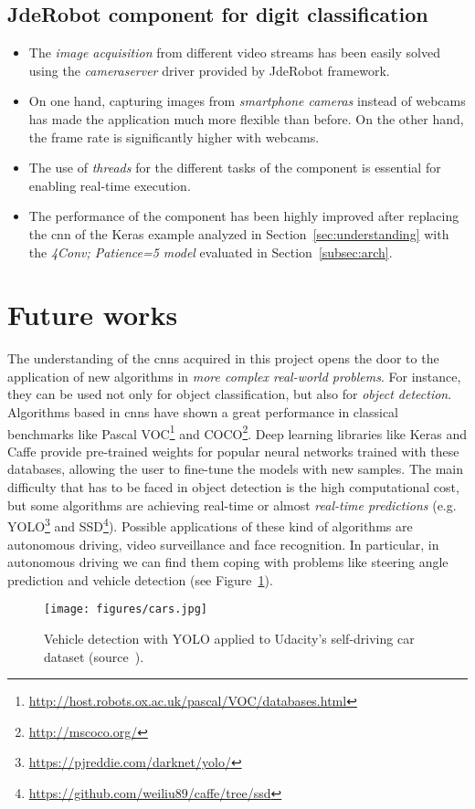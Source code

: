 \subsection*{JdeRobot component for digit classification}
\begin{itemize}
	\item The \emph{image acquisition} from different video streams has been easily solved using the \textit{cameraserver} driver provided by JdeRobot framework.
	\item On one hand, capturing images from \emph{smartphone cameras} instead of webcams has made the application much more flexible than before. On the other hand, the frame rate is significantly higher with webcams.
	\item The use of \emph{threads} for the different tasks of the component is essential for enabling real-time execution.
	\item The performance of the component has been highly improved after replacing the \gls{cnn} of the Keras example analyzed in Section~\ref{sec:understanding} with the \emph{\textit{4Conv; Patience=5} model} evaluated in Section~\ref{subsec:arch}.
\end{itemize}

\section{Future works}
The understanding of the \glspl{cnn} acquired in this project opens the door to the application of new algorithms in \emph{more complex real-world problems}. For instance, they can be used not only for object classification, but also for \emph{object detection}. Algorithms based in \glspl{cnn} have shown a great performance in classical benchmarks like Pascal VOC\footnote{\url{http://host.robots.ox.ac.uk/pascal/VOC/databases.html}} and COCO\footnote{\url{http://mscoco.org/}}. Deep learning libraries like Keras and Caffe provide pre-trained weights for popular neural networks trained with these databases, allowing the user to fine-tune the models with new samples. The main difficulty that has to be faced in object detection is the high computational cost, but some algorithms are achieving real-time or almost \emph{real-time predictions} (e.g. YOLO\footnote{\url{https://pjreddie.com/darknet/yolo/}} and SSD\footnote{\url{https://github.com/weiliu89/caffe/tree/ssd}}). Possible applications of these kind of algorithms are autonomous driving, video surveillance and face recognition. In particular, in autonomous driving we can find them coping with problems like steering angle prediction and vehicle detection (see Figure~\ref{fig:vehicle}).
\begin{figure}
	\centering
	\texttt{[image: figures/cars.jpg]}
	\caption{Vehicle detection with YOLO applied to Udacity's self-driving car dataset (source~\cite{udacity}).}
	\label{fig:vehicle}
\end{figure}

